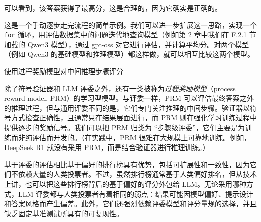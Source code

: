 可以看到，该答案获得了最高分，这是合理的，因为它确实是正确的。

这是一个手动逐步走完流程的简单示例。我们可以进一步扩展这一思路，实现一个 \texttt{for} 循环，用评估数据集中的问题迭代地查询模型（例如第 2 章中我们在 F.2.1 节加载的 Qwen3 模型），通过 gpt-oss 对它进行评估，并计算平均分。对两个模型（例如 Qwen3 的基础模型和推理模型）都这样做，就可以相互比较这两个模型。

\begin{mySidebar}{使用过程奖励模型对中间推理步骤评分}

除了符号验证器和 LLM 评委之外，还有一类被称为\emph{过程奖励模型}（process reward model, PRM）的学习型模型。与评委一样，PRM 可以评估最终答案之外的推理过程，但与通用评委不同的是，它们专门关注推理的中间步骤。验证器以符号方式检查正确性，且通常只在结果层面进行，而 PRM 则在强化学习训练过程中提供逐步的奖励信号。我们可以把 PRM 归类为 “步骤级评委”，它们主要是为训练而非纯评估而开发的。（在实践中，PRM 很难在大规模上可靠地训练。例如，DeepSeek R1 就没有采用 PRM，而是结合验证器进行推理训练。）

\end{mySidebar}

基于评委的评估相比基于偏好的排行榜具有优势，包括可扩展性和一致性，因为它们不依赖大量的人类投票者。不过，虽然排行榜通常基于人类偏好排名，但从技术上讲，也可以把这些排行榜背后的基于偏好的评分外包给 LLM。无论采用哪种方式，LLM 评委都与人类投票者有着相同的弱点：结果可能因模型偏好、提示设计和答案风格而产生偏差。此外，它们还强烈依赖评委模型和评分量规的选择，并且缺乏固定基准测试所具有的可复现性。
